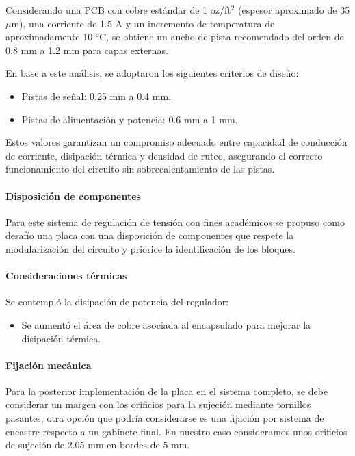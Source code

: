 \documentclass[]{article}
\begin{document}
	Considerando una PCB con cobre estándar de 1 oz/ft\(^2\) (espesor aproximado de 35 $\mu$m), una corriente de 1.5 A y un incremento de temperatura de aproximadamente 10 °C, se obtiene un ancho de pista recomendado del orden de 0.8 mm a 1.2 mm para capas externas.
	
	En base a este análisis, se adoptaron los siguientes criterios de diseño:
	
	\begin{itemize}
		\item Pistas de señal: 0.25 mm a 0.4 mm.
		\item Pistas de alimentación y potencia: 0.6 mm a 1 mm.
	\end{itemize}
	
	Estos valores garantizan un compromiso adecuado entre capacidad de conducción de corriente, disipación térmica y densidad de ruteo, asegurando el correcto funcionamiento del circuito sin sobrecalentamiento de las pistas.
	
	
	
	\paragraph{Disposición de componentes}
	Para este sistema de regulación de tensión con fines académicos se propuso como desafío una placa con una disposición de componentes que respete la modularización del circuito y priorice la identificación de los bloques.
	
	
	\paragraph{Consideraciones térmicas}
	Se contempló la disipación de potencia del regulador:
	\begin{itemize}
		\item Se aumentó el área de cobre asociada al encapsulado para mejorar la disipación térmica.
	\end{itemize}
	
	\paragraph{Fijación mecánica }
	
	Para la posterior implementación de la placa en el sistema completo, se debe considerar un margen con los orificios para la sujeción mediante tornillos pasantes, otra opción que podría considerarse es una fijación por sistema de encastre respecto a un gabinete final. En nuestro caso consideramos unos orificios de sujeción de 2.05 mm en bordes de 5 mm.
\end{document}
